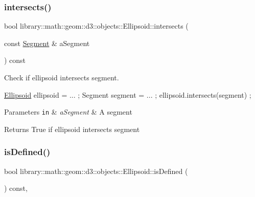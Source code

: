 \subsubsection{\texorpdfstring{intersects()}{intersects()}}
{\footnotesize\ttfamily bool library\+::math\+::geom\+::d3\+::objects\+::\+Ellipsoid\+::intersects (\begin{DoxyParamCaption}\item[{const \hyperlink{classlibrary_1_1math_1_1geom_1_1d3_1_1objects_1_1_segment}{Segment} \&}]{a\+Segment }\end{DoxyParamCaption}) const}



Check if ellipsoid intersects segment. 


\begin{DoxyCode}
\hyperlink{classlibrary_1_1math_1_1geom_1_1d3_1_1objects_1_1_ellipsoid_aae81fe0edc7f0e8d4590ea89ae73cb14}{Ellipsoid} ellipsoid = ... ;
Segment segment = ... ;
ellipsoid.intersects(segment) ;
\end{DoxyCode}



\begin{DoxyParams}[1]{Parameters}
\mbox{\tt in}  & {\em a\+Segment} & A segment \\
\hline
\end{DoxyParams}
\begin{DoxyReturn}{Returns}
True if ellipsoid intersects segment 
\end{DoxyReturn}
\mbox{\label{classlibrary_1_1math_1_1geom_1_1d3_1_1objects_1_1_ellipsoid_adb42c2c7734c27dcb16d947fc5c9d76d}} 
\subsubsection{\texorpdfstring{is\+Defined()}{isDefined()}}
{\footnotesize\ttfamily bool library\+::math\+::geom\+::d3\+::objects\+::\+Ellipsoid\+::is\+Defined (\begin{DoxyParamCaption}{ }\end{DoxyParamCaption}) const\hspace{0.3cm}{\ttfamily [override]}, {\ttfamily [virtual]}}



